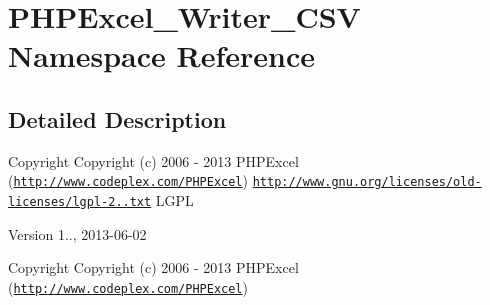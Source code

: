 \hypertarget{namespacePHPExcel__Writer__CSV}{}\section{P\+H\+P\+Excel\+\_\+\+Writer\+\_\+\+C\+SV Namespace Reference}
\label{namespacePHPExcel__Writer__CSV}


\subsection{Detailed Description}
\begin{DoxyCopyright}{Copyright}
Copyright (c) 2006 -\/ 2013 P\+H\+P\+Excel (\href{http://www.codeplex.com/PHPExcel}{\tt http\+://www.\+codeplex.\+com/\+P\+H\+P\+Excel})  \href{http://www.gnu.org/licenses/old-licenses/lgpl-2.1.txt}{\tt http\+://www.\+gnu.\+org/licenses/old-\/licenses/lgpl-\/2..\+txt} L\+G\+PL 
\end{DoxyCopyright}
\begin{DoxyVersion}{Version}
1.., 2013-\/06-\/02
\end{DoxyVersion}
\begin{DoxyCopyright}{Copyright}
Copyright (c) 2006 -\/ 2013 P\+H\+P\+Excel (\href{http://www.codeplex.com/PHPExcel}{\tt http\+://www.\+codeplex.\+com/\+P\+H\+P\+Excel}) 
\end{DoxyCopyright}
